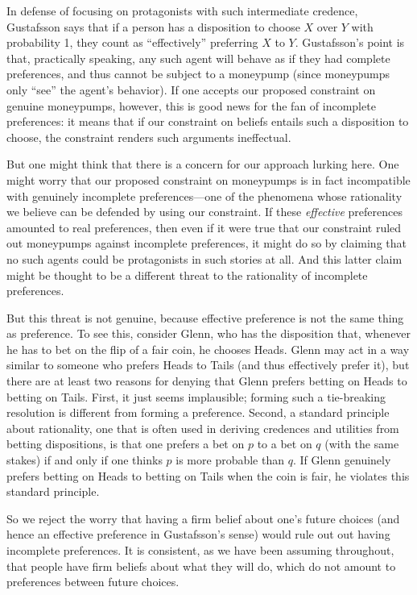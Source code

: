 \documentclass[
  11pt,
  letterpaper,
  DIV=11,
  numbers=noendperiod,
  twoside]{scrartcl}
\begin{document}
In defense of focusing on protagonists with such intermediate credence,
Gustafsson says that if a person has a disposition to choose \(X\) over
\(Y\) with probability 1, they count as ``effectively'' preferring \(X\)
to \(Y\). Gustafsson's point is that, practically speaking, any such
agent will behave as if they had complete preferences, and thus cannot
be subject to a moneypump (since moneypumps only ``see'' the agent's
behavior). If one accepts our proposed constraint on genuine moneypumps,
however, this is good news for the fan of incomplete preferences: it
means that if our constraint on beliefs entails such a disposition to
choose, the constraint renders such arguments ineffectual.

But one might think that there is a concern for our approach lurking
here. One might worry that our proposed constraint on moneypumps is in
fact incompatible with genuinely incomplete preferences---one of the
phenomena whose rationality we believe can be defended by using our
constraint. If these \emph{effective} preferences amounted to real
preferences, then even if it were true that our constraint ruled out
moneypumps against incomplete preferences, it might do so by claiming
that no such agents could be protagonists in such stories at all. And
this latter claim might be thought to be a different threat to the
rationality of incomplete preferences.

But this threat is not genuine, because effective preference is not the
same thing as preference. To see this, consider Glenn, who has the
disposition that, whenever he has to bet on the flip of a fair coin, he
chooses Heads. Glenn may act in a way similar to someone who prefers
Heads to Tails (and thus effectively prefer it), but there are at least
two reasons for denying that Glenn prefers betting on Heads to betting
on Tails. First, it just seems implausible; forming such a tie-breaking
resolution is different from forming a preference. Second, a standard
principle about rationality, one that is often used in deriving
credences and utilities from betting dispositions, is that one prefers a
bet on \(p\) to a bet on \(q\) (with the same stakes) if and only if one
thinks \(p\) is more probable than \(q\). If Glenn genuinely prefers
betting on Heads to betting on Tails when the coin is fair, he violates
this standard principle.

So we reject the worry that having a firm belief about one's future
choices (and hence an effective preference in Gustafsson's sense) would
rule out out having incomplete preferences. It is consistent, as we have
been assuming throughout, that people have firm beliefs about what they
will do, which do not amount to preferences between future choices.
\end{document}
